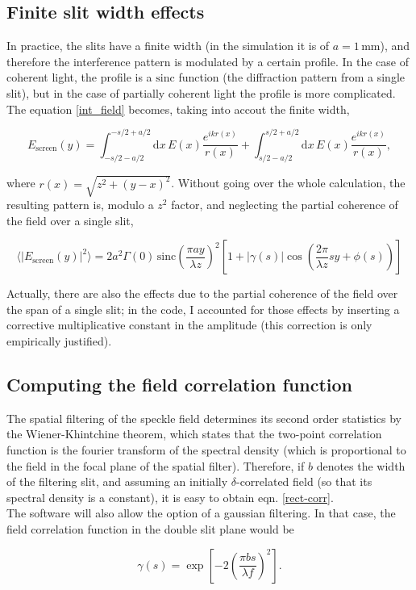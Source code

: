 \subsection{Finite slit width effects}

In practice, the slits have a finite width (in the simulation it is of $a = 1 \, \mathrm{mm}$), and therefore the interference pattern is modulated by a certain 
profile. In the case of coherent light, the profile is a $\mathrm{sinc}$ function (the diffraction pattern from a single slit), but in the case of partially 
coherent light the profile is more complicated. The equation \eqref{int_field} becomes, taking into accout the finite width,

\begin{equation}
    E_{\text{screen}}(y) = \int_{-s/2-a/2}^{-s/2 + a/2} \mathrm dx \, E(x)\frac{e^{ikr(x)}}{r(x)} + \int_{s/2-a/2}^{s/2 + a/2} \mathrm dx \, E(x)\frac{e^{ikr(x)}}{r(x)},
\end{equation}

where $r(x) = \sqrt{z^2 + (y - x)^2}$. Without going over the whole calculation, the resulting pattern is, modulo a $z^2$ factor, and 
neglecting the partial coherence of the field over a single slit,

\begin{equation} \label{theopatt}
    \langle |E_{\text{screen}}(y)|^2 \rangle = 2a^2 \Gamma(0) \, \mathrm{sinc}  \left( \frac{\pi a y}{\lambda z} \right)^2 \left[ 1 + |\gamma(s)| \cos\left( \frac{2\pi}{\lambda z}sy +\phi(s) \right) \right]
\end{equation}

Actually, there are also the effects due to the partial coherence of the field over the span of a single slit; in the code, I accounted for those effects by 
inserting a corrective multiplicative constant in the amplitude (this correction is only empirically justified).

\subsection{Computing the field correlation function} \label{comp_corr}

The spatial filtering of the speckle field determines its second order statistics by the Wiener-Khintchine theorem, which states that the two-point correlation 
function is the fourier transform of the spectral density (which is proportional to the field in the focal plane of the spatial filter). Therefore, if $b$ denotes 
the width of the filtering slit, and assuming an initially $\delta$-correlated field (so that its spectral density is a constant), it is easy to obtain eqn. 
\eqref{rect-corr}. \\

The software will also allow the option of a gaussian filtering. In that case, the field correlation function in the double slit plane would be 

\begin{equation}
    \gamma(s) = \exp\left[-2\left(\frac{\pi bs}{\lambda f}\right)^2\right].
\end{equation}

